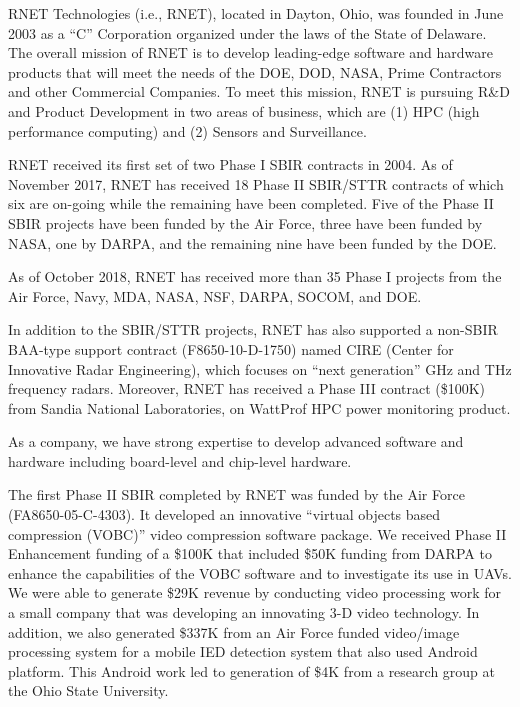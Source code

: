 
RNET Technologies (i.e., RNET), located in Dayton, Ohio, was founded
in June 2003 as a ``C'' Corporation organized under the laws of the
State of Delaware. The overall mission of RNET is to develop
leading-edge software and hardware products that will meet the needs
of the DOE, DOD, NASA, Prime Contractors and other Commercial
Companies. To meet this mission, RNET is pursuing R\&D and Product
Development in two areas of business, which are (1) HPC (high
performance computing) and (2) Sensors and Surveillance.

RNET received its first set of two Phase I SBIR contracts in 2004. As
of November 2017, RNET has received 18 Phase II SBIR/STTR contracts of
which six are on-going while the remaining  have been
completed. Five of the Phase II SBIR projects have been funded by the
Air Force, three have been funded by NASA, one by DARPA, and the
remaining nine have been funded by the DOE.

As of October 2018, RNET has received more than 35 Phase I projects
from the Air Force, Navy, MDA, NASA, NSF, DARPA, SOCOM, and DOE.

In addition to the SBIR/STTR projects, RNET has also supported a
non-SBIR BAA-type support contract (F8650-10-D-1750) named CIRE
(Center for Innovative Radar Engineering), which focuses on ``next
generation'' GHz and THz frequency radars. Moreover, RNET has received
a Phase III contract (\$100K) from Sandia National Laboratories, on WattProf HPC 
power monitoring product. 

As a company, we have strong expertise to develop advanced software
and hardware including board-level and chip-level hardware.

The first Phase II SBIR completed by RNET was funded by the Air Force
(FA8650-05-C-4303). It developed an innovative ``virtual objects based
compression (VOBC)'' video compression software package. We received
Phase II Enhancement funding of a \$100K that included \$50K funding
from DARPA to enhance the capabilities of the VOBC software and to
investigate its use in UAVs. We were able to generate \$29K revenue by
conducting video processing work for a small company that was
developing an innovating 3-D video technology. In addition, we also
generated \$337K from an Air Force funded video/image processing system
for a mobile IED detection system that also used Android
platform. This Android work led to generation of \$4K from a research
group at the Ohio State University.

